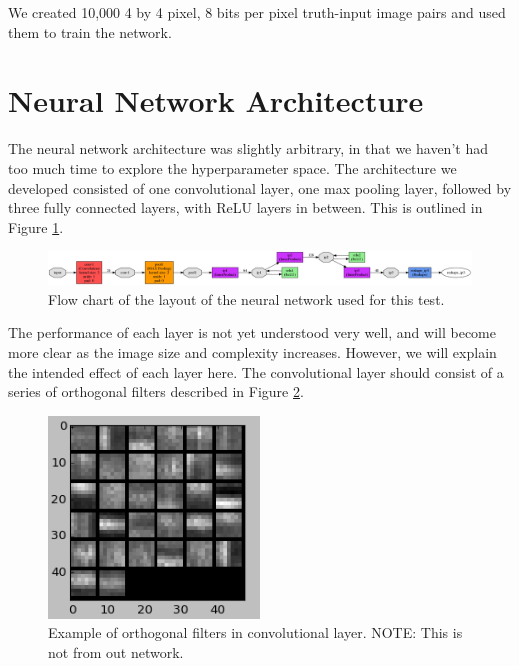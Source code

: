 \documentclass[twoside]{article}
\begin{document}
 We created 10,000 4 by 4 pixel, 8 bits per pixel truth-input image pairs and used them to train the network.
 
\section{Neural Network Architecture}

The neural network architecture was slightly arbitrary, in that we haven't had too much time to explore the hyperparameter space. The architecture we developed consisted of one convolutional layer, one max pooling layer, followed by three fully connected layers, with ReLU layers in between. This is outlined in Figure \ref{net}.

  \begin{figure}[H]
    
    \centering
      \includegraphics[width=\textwidth]{images/net}
      \caption{Flow chart of the layout of the neural network used for this test.}
      \label{net}
  \end{figure}
  
  The performance of each layer is not yet understood very well, and will become more clear as the image size and complexity increases. However, we will explain the intended effect of each layer here. The convolutional layer should consist of a series of orthogonal filters described in Figure \ref{ortho}.
  
    \begin{figure}[H]
      
      \centering
        \includegraphics[width=0.5\textwidth]{images/ortho}
        \caption{Example of orthogonal filters in convolutional layer. NOTE: This is not from out network.}
        \label{ortho}
    \end{figure}
    
\end{document}
